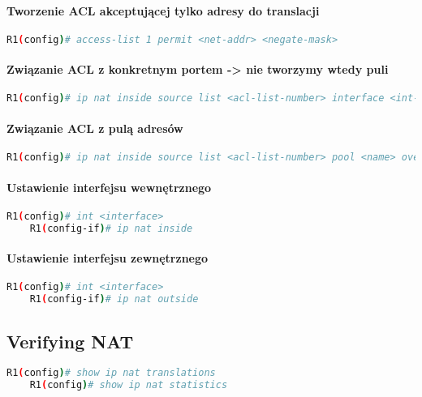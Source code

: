 \documentclass[12pt]{article}
\begin{document}
	\paragraph{Tworzenie ACL akceptującej tylko adresy do translacji}
	\begin{lstlisting}[language=bash]
	R1(config)# access-list 1 permit <net-addr> <negate-mask>
	\end{lstlisting}
	\paragraph{Związanie ACL z konkretnym portem -> nie tworzymy wtedy puli}
	\begin{lstlisting}[language=bash]
	R1(config)# ip nat inside source list <acl-list-number> interface <int-name> overload
	\end{lstlisting}
	\paragraph{Związanie ACL z pulą adresów}
	\begin{lstlisting}[language=bash]
	R1(config)# ip nat inside source list <acl-list-number> pool <name> overload
	\end{lstlisting}
	\paragraph{Ustawienie interfejsu wewnętrznego}
	\begin{lstlisting}[language=bash]
	R1(config)# int <interface>
	R1(config-if)# ip nat inside
	\end{lstlisting}
	\paragraph{Ustawienie interfejsu zewnętrznego}
	\begin{lstlisting}[language=bash]
	R1(config)# int <interface>
	R1(config-if)# ip nat outside
	\end{lstlisting}
	
	\subsection{Verifying NAT}
	\begin{lstlisting}[language=bash]
	R1(config)# show ip nat translations
	R1(config)# show ip nat statistics
	\end{lstlisting}
			
\end{document}
